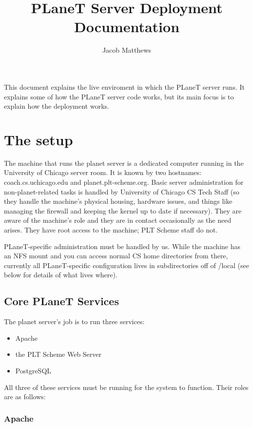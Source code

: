 \documentclass{article}
\title{PLaneT Server Deployment Documentation}
\author{Jacob Matthews}
\begin{document}
\maketitle

This document explains the live enviroment in which the PLaneT server
runs. It explains some of how the PLaneT server code works, but its
main focus is to explain how the deployment works.

\section{The setup}

The machine that runs the planet server is a dedicated computer
running in the University of Chicago server room. It is known by two
hostnames: coach.cs.uchicago.edu and planet.plt-scheme.org. Basic
server administration for non-planet-related tasks is handled by
University of Chicago CS Tech Staff (so they handle the machine's
physical housing, hardware issues, and things like managing the
firewall and keeping the kernel up to date if necessary). They are
aware of the machine's role and they are in contact occasionally as
the need arises. They have root access to the machine; PLT Scheme
staff do not.

PLaneT-specific administration must be handled by us. While the
machine has an NFS mount and you can access normal CS home directories
from there, currently all PLaneT-specific configuration lives in
subdirectories off of /local (see below for details of what lives where).

\subsection{Core PLaneT Services}

The planet server's job is to run three services:
\begin{itemize}
\item Apache
\item the PLT Scheme Web Server
\item PostgreSQL
\end{itemize}

All three of these services must be running for the system to
function. Their roles are as follows:

\subsubsection{Apache}
\end{document}
